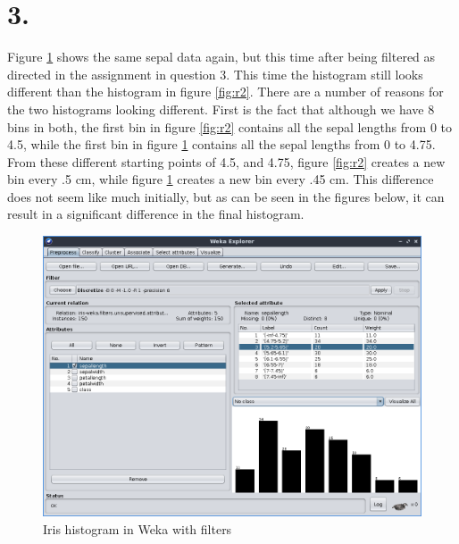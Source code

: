 \documentclass[10pt]{article}
\begin{document}
\section*{3.}
Figure \ref{fig:weka2} shows the same sepal data again, but this time after
being filtered as directed in the assignment in question 3.  This time the 
histogram still looks different than the histogram in figure \ref{fig:r2}.
There are a number of reasons for the two histograms looking different.  First 
is the fact that although we have 8 bins in both, the first bin in figure 
\ref{fig:r2} contains all the sepal lengths from 0 to 4.5, while the first bin
in figure \ref{fig:weka2} contains all the sepal lengths from 0 to 4.75.  From 
these different starting points of 4.5, and 4.75, figure \ref{fig:r2} creates a
new bin every .5 cm, while figure \ref{fig:weka2} creates a new bin every .45 
cm. This difference does not seem like much initially, but as can be seen in the 
figures below, it can result in a significant difference in the final histogram.
\begin{figure}[]
    \includegraphics[width=\textwidth]{wekaFiltered}
    \caption{Iris histogram in Weka with filters}
    \label{fig:weka2}
\end{figure}
\end{document}
